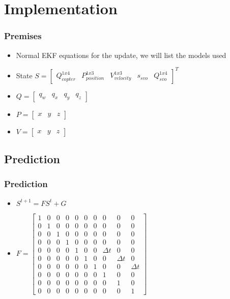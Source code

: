 \documentclass{beamer}
\begin{document}
\section{Implementation}
\begin{frame}
 \frametitle{Premises}
 \begin{itemize}
 \item Normal EKF equations for the update, we will list the models used
 \item State $S = \begin{bmatrix}Q_{copter}^{1x4} & P_{position}^{1x3} & V_{velocity}^{1x3} & s_{svo} & Q_{svo}^{1x4}\end{bmatrix}^T$
 \item $Q = \begin{bmatrix}q_w & q_x & q_y & q_z\end{bmatrix}$
 \item $P = \begin{bmatrix}x & y & z\end{bmatrix}$
 \item $V = \begin{bmatrix}x & y & z\end{bmatrix}$
 \end{itemize}
 
\end{frame}


\subsection{Prediction}
\begin{frame}
\frametitle{Prediction}
  \begin{itemize}
    \item $S^{t+1} = FS^{t} + G$
    \item $F = \begin{bmatrix}
  1& 0& 0& 0& 0& 0& 0&  0&  0&  0\\
  0& 1& 0& 0& 0& 0& 0&  0&  0&  0\\
  0& 0& 1& 0& 0& 0& 0&  0&  0&  0\\
  0& 0& 0& 1& 0& 0& 0&  0&  0&  0\\
  0& 0& 0& 0& 1& 0& 0& \Delta t&  0&  0\\
  0& 0& 0& 0& 0& 1& 0&  0& \Delta t&  0\\
  0& 0& 0& 0& 0& 0& 1&  0&  0& \Delta t\\
  0& 0& 0& 0& 0& 0& 0&  1&  0&  0\\
  0& 0& 0& 0& 0& 0& 0&  0&  1&  0\\
  0& 0& 0& 0& 0& 0& 0&  0&  0&  1 
  \end{bmatrix}$
  \end{itemize} 
\end{frame}
\end{document}
